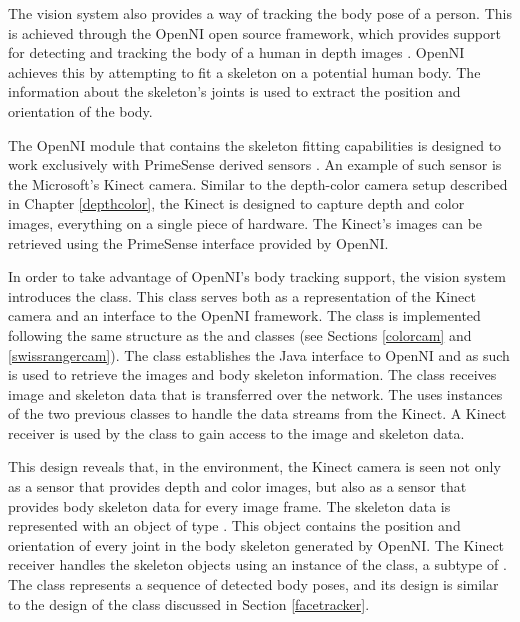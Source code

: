 The vision system also provides a way of tracking the body pose of a person. This is achieved through the
OpenNI open source framework, which provides support for detecting and tracking the body of a human 
in depth images \cite{OpenNI}. OpenNI achieves this by attempting to fit a skeleton on a potential human body. 
The information about the skeleton's joints is used to extract the position and orientation of the body.

The OpenNI module that contains the skeleton fitting capabilities is designed to work exclusively with 
PrimeSense derived sensors \cite{PrimeSensor, NITE}. An example of such sensor is the Microsoft's Kinect 
camera. Similar to the depth-color camera setup described in Chapter \ref{depthcolor}, the Kinect is designed
to capture depth and color images, everything on a single piece of hardware. The Kinect's images can be 
retrieved using the PrimeSense interface provided by OpenNI.

In order to take advantage of OpenNI's body tracking support, the vision system introduces the \KinectCam{} 
class. This class serves both as a representation of the Kinect camera and an interface to the OpenNI 
framework. The \KinectCam{} class is implemented following the same structure as the \ColorCam{} and 
\SwissRangerCam{} classes (see Sections \ref{colorcam} and \ref{swissrangercam}). The \KinectJavaAcquire{}
class establishes the Java interface to OpenNI and as such is used to retrieve the images and body 
skeleton information. The \KinectPacketHandler{} class receives image and skeleton data that is transferred 
over the network. The \KinectReceiver{} uses instances of the two previous classes to handle the data streams 
from the Kinect. A Kinect receiver is used by the \KinectCam{} class to gain access to the image and 
skeleton data. 

This design reveals that, in the \RD{} environment, the Kinect camera is seen not only as a sensor that 
provides depth and color images, but also as a sensor that provides body skeleton data for every image 
frame. The skeleton data is represented with an object of type \KinectSkeleton{}. This object contains the 
position and orientation of every joint in the body skeleton generated by OpenNI. The Kinect receiver handles
the skeleton objects using an instance of the \KinectSkeletonStream{} class, a subtype of \Stream{}. The 
\KinectSkeletonStream{} class represents a sequence of detected body poses, and its design is similar to the 
design of the \FaceStream{} class discussed in Section \ref{facetracker}.

